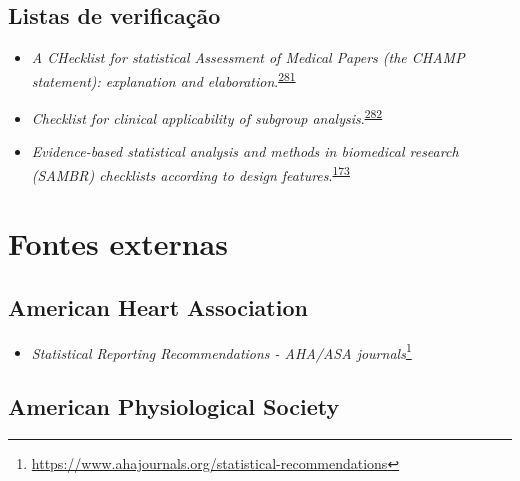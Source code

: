 \documentclass[
  a4paper,
]{book}
\providecommand{\tightlist}{%
  \setlength{\itemsep}{0pt}\setlength{\parskip}{0pt}}
\renewcommand{\href}[2]{#2\footnote{\url{#1}}}
\begin{document}
\hypertarget{listas-de-verificauxe7uxe3o}{%
\section*{Listas de verificação}\label{listas-de-verificauxe7uxe3o}}

\begin{itemize}
\item
  \emph{A CHecklist for statistical Assessment of Medical Papers (the CHAMP statement): explanation and elaboration}.\textsuperscript{\protect\hyperlink{ref-Mansournia2021}{281}}
\item
  \emph{Checklist for clinical applicability of subgroup analysis}.\textsuperscript{\protect\hyperlink{ref-Gil-Sierra2020}{282}}
\item
  \emph{Evidence-based statistical analysis and methods in biomedical research (SAMBR) checklists according to design features}.\textsuperscript{\protect\hyperlink{ref-dwivedi2019}{173}}
\end{itemize}

\hypertarget{fontes-externas}{%
\chapter*{\texorpdfstring{\textbf{Fontes externas}}{Fontes externas}}\label{fontes-externas}}

\hypertarget{american-heart-association}{%
\section*{American Heart Association}\label{american-heart-association}}

\begin{itemize}
\tightlist
\item
  \href{https://www.ahajournals.org/statistical-recommendations}{\emph{Statistical Reporting Recommendations - AHA/ASA journals}}
\end{itemize}

\hypertarget{american-physiological-society}{%
\section*{American Physiological Society}\label{american-physiological-society}}
\end{document}
